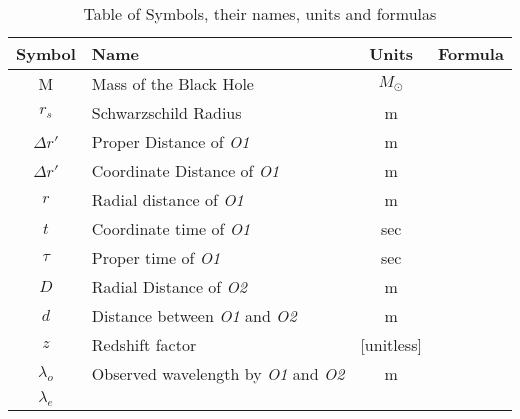 \begin{table}[]
    \centering
    \begin{tabular}{clcc}
    \hline
    \multicolumn{1}{|c|}{\textbf{Symbol}} & \multicolumn{1}{l|}{\textbf{Name}} & \multicolumn{1}{c|}{\textbf{Units}} & \multicolumn{1}{c|}{\textbf{Formula}} \\ \hline
    M & Mass of the Black Hole & \(M_{\odot}\) &  \\
    \(r_s\) & Schwarzschild Radius & m &  \\
    \(\Delta r'\) & Proper Distance of \textit{O1} & m &  \\
    \(\Delta r'\) & Coordinate Distance of \textit{O1} & m &  \\
    \(r\) & Radial distance of \textit{O1} & m &  \\
    \(t\) & Coordinate time of \textit{O1} & sec &  \\
    \(\tau\) & Proper time of \textit{O1} & sec &  \\
    \(D\) & Radial Distance of \textit{O2} & m &  \\
    \(d\) & Distance between \textit{O1} and \textit{O2} & m &  \\
    \(z\) & Redshift factor & [unitless] &  \\
    \(\lambda_o\) & Observed wavelength by \textit{O1} and \textit{O2} & m &  \\
    \(\lambda_e\) &  &  & 
    \end{tabular}
    \caption{Table of Symbols, their names, units and formulas}
    \label{tab:sym_tab}
\end{table}